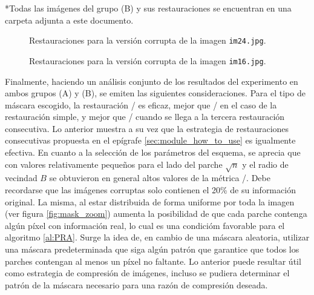 
\begin{scriptsize}
	*Todas las im\'agenes del grupo (B) y sus restauraciones se encuentran en una carpeta adjunta a este documento.
\end{scriptsize}

\begin{figure}[h]
	\centering
	\caption{Restauraciones para la versi\'on corrupta de la imagen \texttt{im24.jpg}.}
	\label{fig:im24.jpg}
\end{figure}

\begin{figure}[h]
	\centering
	\caption{Restauraciones para la versi\'on corrupta de la imagen \texttt{im16.jpg}.}
	\label{fig:im16.jpg}
\end{figure}

Finalmente, haciendo un an\'alisis conjunto de los resultados del experimento en ambos grupos (A) y (B), se emiten las siguientes consideraciones. Para el tipo de m\'ascara escogido, la restauraci\'on \SOP/ es eficaz, mejor que \TELEA/ en el caso de la restauraci\'on simple, y mejor que \NS/ cuando se llega a la tercera restauraci\'on consecutiva. Lo anterior muestra a su vez que la estrategia de restauraciones consecutivas propuesta en el ep\'igrafe \ref{sec:module_how_to_use} es igualmente efectiva. En cuanto a la selecci\'on de los par\'ametros del esquema, se aprecia que con valores relativamente pequeños para el lado del parche $\sqrt{n}$ y el radio de vecindad $B$ se obtuvieron en general altos valores de la m\'etrica \PSNR/. Debe recordarse que las im\'agenes corruptas solo contienen el 20\% de su informaci\'on original. La misma, al estar distribuida de forma uniforme por toda la imagen (ver figura \ref{fig:mask_zoom}) aumenta la posibilidad de que cada parche contenga alg\'un p\'ixel con informaci\'on real, lo cual es una condici\'om favorable para el algoritmo \ref{al:PRA}. Surge la idea de, en cambio de una m\'ascara aleatoria, utilizar una m\'ascara predeterminada que siga alg\'un patr\'on que garantice que todos los parches contengan al menos un p\'ixel no faltante. Lo anterior puede resultar \'util como estrategia de compresi\'on de im\'agenes, incluso se pudiera determinar el patr\'on de la m\'ascara necesario para una raz\'on de compresi\'on deseada.

